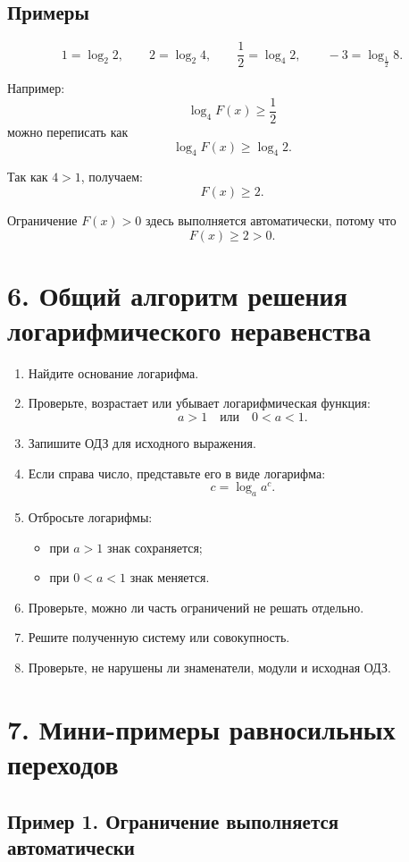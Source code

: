 \documentclass[a4paper,12pt]{article}
\newcommand{\sectionline}{\vspace{0.35em}{\color{accent}\hrule height 0.6pt}\vspace{0.65em}}
\begin{document}
\subsection*{\textcolor{accent}{Примеры}}

\[
1=\log_2 2,
\qquad
2=\log_2 4,
\qquad
\frac12=\log_4 2,
\qquad
-3=\log_{\frac12}8.
\]

Например:
\[
\log_4 F(x)\ge\frac12
\]
можно переписать как
\[
\log_4 F(x)\ge \log_4 2.
\]

Так как $4>1$, получаем:
\[
F(x)\ge2.
\]

Ограничение $F(x)>0$ здесь выполняется автоматически, потому что
\[
F(x)\ge2>0.
\]

\section*{\textcolor{darkaccent}{6. Общий алгоритм решения логарифмического неравенства}}
\sectionline

\begin{enumerate}
    \item Найдите основание логарифма.
    \item Проверьте, возрастает или убывает логарифмическая функция:
    \[
    a>1 \quad \text{или} \quad 0<a<1.
    \]
    \item Запишите ОДЗ для исходного выражения.
    \item Если справа число, представьте его в виде логарифма:
    \[
    c=\log_a a^c.
    \]
    \item Отбросьте логарифмы:
    \begin{itemize}
        \item при $a>1$ знак сохраняется;
        \item при $0<a<1$ знак меняется.
    \end{itemize}
    \item Проверьте, можно ли часть ограничений не решать отдельно.
    \item Решите полученную систему или совокупность.
    \item Проверьте, не нарушены ли знаменатели, модули и исходная ОДЗ.
\end{enumerate}

\section*{\textcolor{darkaccent}{7. Мини-примеры равносильных переходов}}
\sectionline

\subsection*{\textcolor{accent}{Пример 1. Ограничение выполняется автоматически}}
\end{document}
